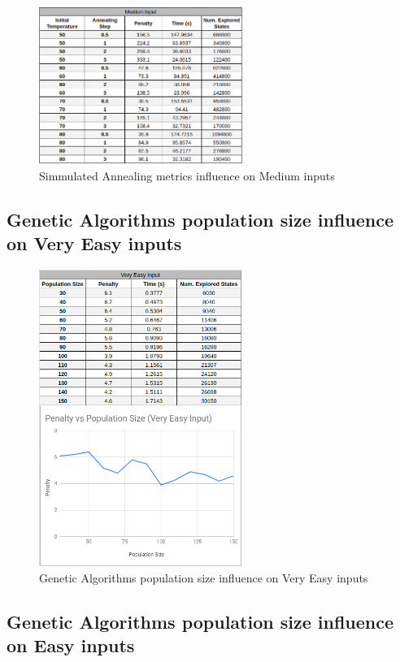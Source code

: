 \documentclass[conference]{IEEEtran}
\begin{document}
\begin{figure}[H]
    \centerline{\includegraphics[width=250px]{annealing_medium.png}}
    \caption{Simmulated Annealing metrics influence on Medium inputs}
\end{figure}

\subsection{Genetic Algorithms population size influence on Very Easy inputs}

\begin{figure}[H]
    \centerline{\includegraphics[width=250px]{genetic_pop_size_very_easy.png}}
    \caption{Genetic Algorithms population size influence on Very Easy inputs}
\end{figure}

\subsection{Genetic Algorithms population size influence on Easy inputs}
\end{document}
